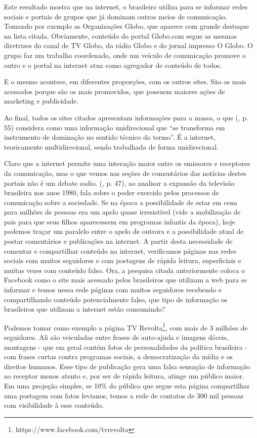 \documentclass[
	article,			%
	12pt,				%
	oneside,			%
	a4paper,			%
	english,			%
	brazil,				%
	]{abntex2}
\begin{document}
Este resultado mostra que na internet, o brasileiro utiliza para se informar redes sociais e portais de grupos que já dominam outros meios de comunicação. Tomando por exemplo as Organizações Globo, que aparece com grande destaque na lista citada. Obviamente, conteúdo do portal Globo.com segue as mesmas diretrizes do canal de TV Globo, da rádio Globo e do jornal impresso O Globo. O grupo faz um trabalho coordenado, onde um veículo de comunicação promove o outro e o portal na internet atua como agregador de conteúdo de todos.

E o mesmo acontece, em diferentes proporções, com os outros sites. São os mais acessados porque são os mais promovidos, que possuem maiores ações de marketing e publicidade. 

Ao final, todos os sites citados apresentam informações para a massa, o que  (\citeyear{bolano2000}, p. 55) considera como uma informação unidirecional que “se transforma em instrumento de dominação no sentido técnico do termo”. É a internet, teoricamente multidirecional, sendo trabalhada de forma unidirecional.

Claro que a internet permite uma interação maior entre os emissores e receptores da comunicação, mas o que vemos nas seções de comentários das notícias destes portais não é um debate sadio.  (\citeyear{ribeiro1991}, p. 47), ao analisar a expansão da televisão brasileira nos anos 1980, fala sobre o poder exercido pelos processos de comunicação sobre a sociedade. Se na época a possibilidade de estar em cena para milhões de pessoas era um apelo quase irresistível (vide a mobilização de pais para que seus filhos aparecessem em programas infantis da época), hoje podemos traçar um paralelo entre o apelo de outrora e a possibilidade atual de postar comentários e publicações na internet. A partir desta necessidade de comentar e compartilhar conteúdo na internet, verificamos páginas nas redes sociais com muitos seguidores e com postagens de rápida leitura, superficiais e muitas vezes com conteúdo falso. Ora, a pesquisa citada anteriormente coloca o Facebook como o site mais acessado pelos brasileiros que utilizam a web para se informar e temos nessa rede páginas com muitos seguidores recebendo e compartilhando conteúdo potencialmente falso, que tipo de informação os brasileiros que utilizam a internet estão consumindo?

Podemos tomar como exemplo a página TV Revolta\footnote{https://www.facebook.com/tvrevolta}, com mais de 3 milhões de seguidores. Ali são veiculadas entre frases de auto-ajuda e imagens dóceis, montagens - que em geral contém fotos de personalidades da política brasileira - com frases curtas contra programas sociais, a democratização da mídia e os direitos humanos. Esse tipo de publicação gera uma falsa sensação de informação ao receptor menos atento e, por ser de rápida leitura, atinge um público maior. Em uma projeção simples, se 10\% do público que segue esta página compartilhar uma postagem com fatos levianos, temos a rede de contatos de 300 mil pessoas com visibilidade à esse conteúdo.
\end{document}
